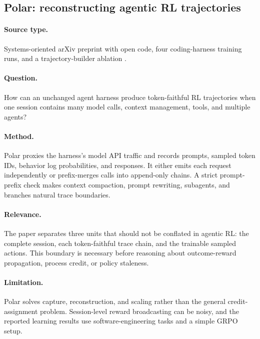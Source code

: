 \subsection{Polar: reconstructing agentic RL trajectories}

\paragraph{Source type.}
Systems-oriented arXiv preprint with open code, four coding-harness training runs, and a
trajectory-builder ablation \citep{xu2026polar}.

\paragraph{Question.}
How can an unchanged agent harness produce token-faithful RL trajectories when one session
contains many model calls, context management, tools, and multiple agents?

\paragraph{Method.}
Polar proxies the harness's model API traffic and records prompts, sampled token IDs,
behavior log probabilities, and responses. It either emits each request independently or
prefix-merges calls into append-only chains. A strict prompt-prefix check makes context
compaction, prompt rewriting, subagents, and branches natural trace boundaries.

\paragraph{Relevance.}
The paper separates three units that should not be conflated in agentic RL: the complete
session, each token-faithful trace chain, and the trainable sampled actions. This boundary
is necessary before reasoning about outcome-reward propagation, process credit, or policy
staleness.

\paragraph{Limitation.}
Polar solves capture, reconstruction, and scaling rather than the general credit-assignment
problem. Session-level reward broadcasting can be noisy, and the reported learning
results use software-engineering tasks and a simple GRPO setup.
